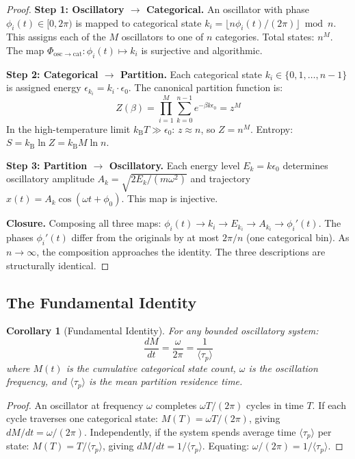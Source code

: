 \documentclass[11pt,a4paper]{article}
\newtheorem{corollary}[theorem]{Corollary}
\theoremstyle{definition}
\theoremstyle{remark}
\newcommand{\kB}{k_{\mathrm{B}}}
\newcommand{\taup}{\tau_p}
\begin{document}
\begin{proof}
\textbf{Step 1: Oscillatory $\to$ Categorical.} An oscillator with phase $\phi_i(t) \in [0, 2\pi)$ is mapped to categorical state $k_i = \lfloor n \phi_i(t) / (2\pi) \rfloor \bmod n$. This assigns each of the $M$ oscillators to one of $n$ categories. Total states: $n^M$. The map $\Phi_{\mathrm{osc} \to \mathrm{cat}}: \phi_i(t) \mapsto k_i$ is surjective and algorithmic.

\textbf{Step 2: Categorical $\to$ Partition.} Each categorical state $k_i \in \{0, 1, \ldots, n-1\}$ is assigned energy $\epsilon_{k_i} = k_i \cdot \epsilon_0$. The canonical partition function is:
\begin{equation}
Z(\beta) = \prod_{i=1}^{M} \sum_{k=0}^{n-1} e^{-\beta k \epsilon_0} = z^M
\end{equation}
In the high-temperature limit $\kB T \gg \epsilon_0$: $z \approx n$, so $Z = n^M$. Entropy: $S = \kB \ln Z = \kB M \ln n$.

\textbf{Step 3: Partition $\to$ Oscillatory.} Each energy level $E_k = k \epsilon_0$ determines oscillatory amplitude $A_k = \sqrt{2E_k/(m\omega^2)}$ and trajectory $x(t) = A_k \cos(\omega t + \phi_0)$. This map is injective.

\textbf{Closure.} Composing all three maps: $\phi_i(t) \to k_i \to E_{k_i} \to A_{k_i} \to \phi_i'(t)$. The phases $\phi_i'(t)$ differ from the originals by at most $2\pi/n$ (one categorical bin). As $n \to \infty$, the composition approaches the identity. The three descriptions are structurally identical.
\end{proof}

\subsection{The Fundamental Identity}

\begin{corollary}[Fundamental Identity]
\label{cor:fundamental}
For any bounded oscillatory system:
\begin{equation}
\boxed{\frac{dM}{dt} = \frac{\omega}{2\pi} = \frac{1}{\langle \taup \rangle}}
\label{eq:fundamental_identity}
\end{equation}
where $M(t)$ is the cumulative categorical state count, $\omega$ is the oscillation frequency, and $\langle \taup \rangle$ is the mean partition residence time.
\end{corollary}

\begin{proof}
An oscillator at frequency $\omega$ completes $\omega T/(2\pi)$ cycles in time $T$. If each cycle traverses one categorical state: $M(T) = \omega T/(2\pi)$, giving $dM/dt = \omega/(2\pi)$. Independently, if the system spends average time $\langle \taup \rangle$ per state: $M(T) = T/\langle \taup \rangle$, giving $dM/dt = 1/\langle \taup \rangle$. Equating: $\omega/(2\pi) = 1/\langle \taup \rangle$.
\end{proof}
\end{document}
